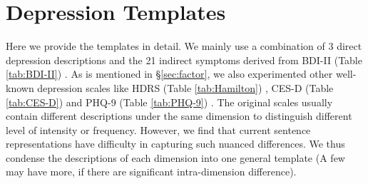\documentclass{article}
\begin{document}
\section{Depression Templates}

Here we provide the templates in detail. We mainly use a combination of 3 direct depression descriptions and the 21 indirect symptoms derived from BDI-II (Table \ref{tab:BDI-II}) \cite{beck1996beck}. As is mentioned in \S \ref{sec:factor}, we also experimented other well-known depression scales like HDRS (Table \ref{tab:Hamilton}) \cite{hamilton1986hamilton}, CES-D (Table \ref{tab:CES-D}) \cite{Lenore1977CES-D} and PHQ-9 (Table \ref{tab:PHQ-9}) \cite{kroenke2001phq}. The original scales usually contain different descriptions under the same dimension to distinguish different level of intensity or frequency. However, we find that current sentence representations have difficulty in capturing such nuanced differences. We thus condense the descriptions of each dimension into one general template (A few may have more, if there are significant intra-dimension difference).
\end{document}
